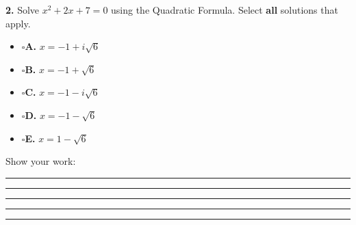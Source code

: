 \documentclass[11pt]{article}
\newcommand{\checkbox}{$\square$\;}
\begin{document}
\vspace{6pt}
\begin{minipage}[t]{0.50\textwidth}
\textbf{2.} Solve $x^2+2x+7=0$ using the Quadratic Formula. Select \textbf{all} solutions that apply.

\vspace{4pt}
\begin{itemize}[leftmargin=1.2em, itemsep=5pt]
\item[] \checkbox \textbf{A.} $x=-1+i\sqrt{6}$
\item[] \checkbox \textbf{B.} $x=-1+\sqrt{6}$
\item[] \checkbox \textbf{C.} $x=-1-i\sqrt{6}$
\item[] \checkbox \textbf{D.} $x=-1-\sqrt{6}$
\item[] \checkbox \textbf{E.} $x=1-\sqrt{6}$
\end{itemize}
\end{minipage}\hfill
\begin{minipage}[t]{0.46\textwidth}
Show your work:

\vspace{14pt}\rule{\linewidth}{0.4pt}

\vspace{14pt}\rule{\linewidth}{0.4pt}

\vspace{14pt}\rule{\linewidth}{0.4pt}

\vspace{14pt}\rule{\linewidth}{0.4pt}
\end{minipage}

\vspace{10pt}\noindent\rule{\textwidth}{0.4pt}
\end{document}
